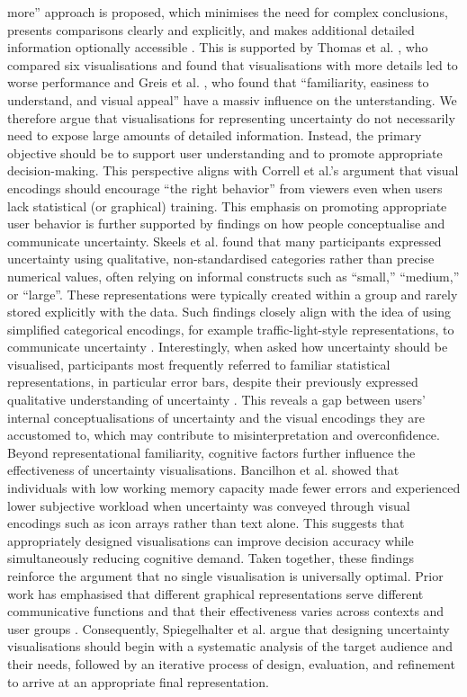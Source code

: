 \documentclass[final,journal,a4paper]{IEEEtran}
\begin{document}
more'' approach is proposed, which minimises the need for complex conclusions, presents comparisons clearly and explicitly, and makes additional detailed information optionally accessible \cite{Spiegelhalter2011}. This is supported by Thomas et al. \cite{Thomas2024}, who compared six visualisations and found that visualisations with more details led to worse performance and Greis et al. \cite{Greis2015}, who found that ``familiarity, easiness to understand, and visual appeal'' have a massiv influence on the unterstanding. We therefore argue that visualisations for representing uncertainty do not necessarily need to expose large amounts of detailed information. Instead, the primary objective should be to support user understanding and to promote appropriate decision-making. This perspective aligns with Correll et al.’s \cite{Correll2014} argument that visual encodings should encourage “the right behavior” from viewers even when users lack statistical (or graphical) training.
\newline
This emphasis on promoting appropriate user behavior is further supported by findings on how people conceptualise and communicate uncertainty. Skeels et al. \cite{Skeels2008} found that many participants expressed uncertainty using qualitative, non-standardised categories rather than precise numerical values, often relying on informal constructs such as “small,” “medium,” or “large”. These representations were typically created within a group and rarely stored explicitly with the data. Such findings closely align with the idea of using simplified categorical encodings, for example traffic-light-style representations, to communicate uncertainty \cite{Skeels2008}. Interestingly, when asked how uncertainty should be visualised, participants most frequently referred to familiar statistical representations, in particular error bars, despite their previously expressed qualitative understanding of uncertainty \cite{Skeels2008}. This reveals a gap between users’ internal conceptualisations of uncertainty and the visual encodings they are accustomed to, which may contribute to misinterpretation and overconfidence. Beyond representational familiarity, cognitive factors further influence the effectiveness of uncertainty visualisations. Bancilhon et al. \cite{Bancilhon2023} showed that individuals with low working memory capacity made fewer errors and experienced lower subjective workload when uncertainty was conveyed through visual encodings such as icon arrays rather than text alone. This suggests that appropriately designed visualisations can improve decision accuracy while simultaneously reducing cognitive demand. Taken together, these findings reinforce the argument that no single visualisation is universally optimal. Prior work has emphasised that different graphical representations serve different communicative functions and that their effectiveness varies across contexts and user groups \cite{Lipkus1999, Spiegelhalter2011, Spiegelhalter2017}. Consequently, Spiegelhalter et al. \cite{Spiegelhalter2011} argue that designing uncertainty visualisations should begin with a systematic analysis of the target audience and their needs, followed by an iterative process of design, evaluation, and refinement to arrive at an appropriate final representation.
\end{document}
